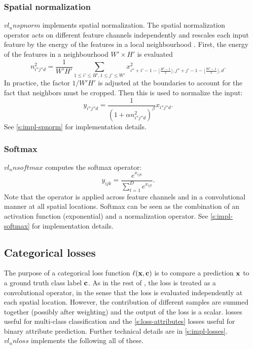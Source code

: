 \subsubsection{Spatial normalization}\label{s:spnorm}

$vl_nnspnorm$ implements spatial normalization. The spatial normalization operator acts on different feature channels independently and rescales each input feature by the energy of the features in a local neighbourhood . First, the energy of the features in a neighbourhood $W'\times H'$ is evaluated
\[
n_{i''j''d}^2 = \frac{1}{W'H'}
\sum_{1\leq i' \leq H', 1 \leq j' \leq W'} x^2_{
	i''+i'-1-\lfloor \frac{H'-1}{2}\rfloor,
	j''+j'-1-\lfloor \frac{W'-1}{2}\rfloor,
	d}.
\]
In practice, the factor $1/W'H'$ is adjusted at the boundaries to account for the fact that neighbors must be cropped. Then this is used to normalize the input:
\[
y_{i''j''d} = \frac{1}{(1 + \alpha n_{i''j''d}^2)^\beta} x_{i''j''d}.
\]
See \cref{s:impl-spnorm} for implementation details.

\subsubsection{Softmax}\label{s:softmax}

$vl_nnsoftmax$ computes the softmax operator:
\[
y_{ijk} = \frac{e^{x_{ijk}}}{\sum_{t=1}^D e^{x_{ijt}}}.
\]
Note that the operator is applied across feature channels and in a convolutional manner at all spatial locations. Softmax can be seen as the combination of an activation function (exponential) and a normalization operator. See \cref{s:impl-softmax} for implementation details.

\subsection{Categorical losses}\label{s:losses}

The purpose of a categorical loss function $\ell(\mathbf{x},\mathbf{c})$ is to compare a prediction $\mathbf{x}$ to a ground truth class label $\mathbf{c}$. As in the rest of \matconvnet, the loss is treated as a convolutional operator, in the sense that the loss is evaluated independently at each spatial location. However, the contribution of different samples are summed together (possibly after weighting) and the output of the loss is a scalar.  losses useful for multi-class classification and the \cref{s:loss-attributes} losses useful for binary attribute prediction. Further technical details are in \cref{s:impl-losses}. $vl_nnloss$ implements the following all of these.

